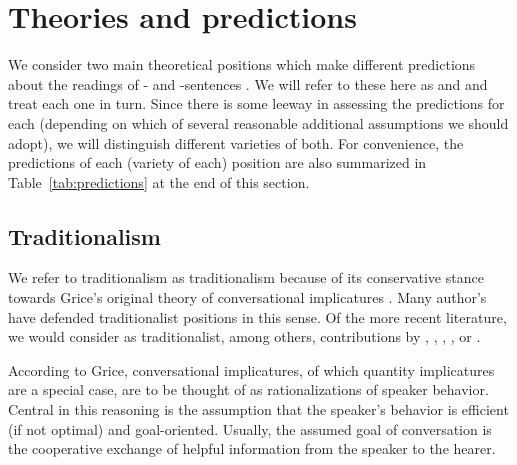 \documentclass[fleqn,reqno,10pt,draft]{article}
\newcommand{\as}{\acro{as}}
\renewcommand{\es}{\acro{es}}
\begin{document}
\section{Theories and predictions}
\label{sec:theories-predictions}

We consider two main theoretical positions which make different
predictions about the readings of \as- and \es-sentences
\citep[c.f.][for
overview]{Horn2006:The-Border-Wars,Geurts2010:Quantity-Implic,Sauerland2012:The-Computation}. We
will refer to these here as  and
 and treat each one in turn. Since there is
some leeway in assessing the predictions for each (depending on which
of several reasonable additional assumptions we should adopt), we will
distinguish different varieties of both. For convenience, the
predictions of each (variety of each) position are also summarized in
Table~\ref{tab:predictions} at the end of this section.

\subsection{Traditionalism}
\label{sec:traditionalism}

We refer to traditionalism as traditionalism because of its
conservative stance towards Grice's original theory of conversational
implicatures \citep{Grice1975:Logic-and-Conve}. Many author's have
defended traditionalist positions in this sense. Of the more recent
literature, we would consider as traditionalist, among others,
contributions by \citet{Spector2006:Scalar-Implicat},
\citet{Sauerland2004:Scalar-Implicat},
\citet{Russell2006:Against-Grammat},
\citet{vanRooijSchulz:ExhaustiveInterpretation},
\citet{Geurts2010:Quantity-Implic} or
\citet{Franke2011:Quantity-Implic}.

According to Grice, conversational implicatures, of which quantity
implicatures are a special case, are to be thought of as
rationalizations of speaker behavior. Central in this reasoning is the
assumption that the speaker's behavior is efficient (if not optimal)
and goal-oriented. Usually, the assumed goal of conversation is the
cooperative exchange of helpful information from the speaker to the
hearer.
\end{document}
